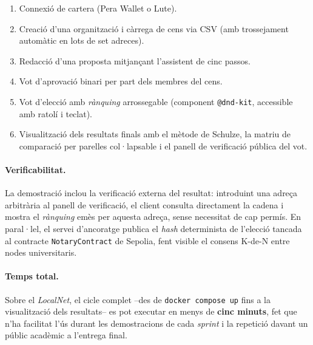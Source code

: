 \begin{enumerate}
    \item Connexió de cartera (Pera Wallet o Lute).
    \item Creació d'una organització i càrrega de cens via \ac{CSV}
    (amb trossejament automàtic en lots de set adreces).
    \item Redacció d'una proposta mitjançant l'assistent de cinc
    passos.
    \item Vot d'aprovació binari per part dels membres del cens.
    \item Vot d'elecció amb \emph{rànquing} arrossegable (component
    \texttt{@dnd-kit}, accessible amb ratolí i teclat).
    \item Visualització dels resultats finals amb el mètode de
    Schulze, la matriu de comparació per parelles col·lapsable i el
    panell de verificació pública del vot.
\end{enumerate}

\paragraph{Verificabilitat.} La demostració inclou la verificació
externa del resultat: introduint una adreça arbitrària al panell de
verificació, el client consulta directament la cadena i mostra el
\emph{rànquing} emès per aquesta adreça, sense necessitat de cap
permís. En paral·lel, el servei d'ancoratge publica el \emph{hash}
determinista de l'elecció tancada al contracte \texttt{NotaryContract}
de Sepolia, fent visible el consens K-de-N entre nodes universitaris.

\paragraph{Temps total.} Sobre el \emph{LocalNet}, el cicle complet
--des de \texttt{docker compose up} fins a la visualització dels
resultats-- es pot executar en menys de \textbf{cinc minuts}, fet que
n'ha facilitat l'ús durant les demostracions de cada \emph{sprint} i
la repetició davant un públic acadèmic a l'entrega final.

